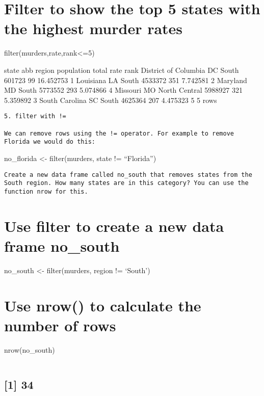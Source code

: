 \documentclass[
]{article}
\begin{document}
\hypertarget{filter-to-show-the-top-5-states-with-the-highest-murder-rates}{%
\section{Filter to show the top 5 states with the highest murder
rates}\label{filter-to-show-the-top-5-states-with-the-highest-murder-rates}}

filter(murders,rate,rank\textless=5)

state abb region population total rate rank District of Columbia DC
South 601723 99 16.452753 1 Louisiana LA South 4533372 351 7.742581 2
Maryland MD South 5773552 293 5.074866 4 Missouri MO North Central
5988927 321 5.359892 3 South Carolina SC South 4625364 207 4.475323 5 5
rows

\begin{verbatim}
5. filter with !=

We can remove rows using the != operator. For example to remove Florida we would do this:
\end{verbatim}

no\_florida \textless- filter(murders, state != ``Florida'')

\begin{verbatim}
Create a new data frame called no_south that removes states from the South region. How many states are in this category? You can use the function nrow for this.
\end{verbatim}

\hypertarget{use-filter-to-create-a-new-data-frame-no_south}{%
\section{Use filter to create a new data frame
no\_south}\label{use-filter-to-create-a-new-data-frame-no_south}}

no\_south \textless- filter(murders, region != `South')

\hypertarget{use-nrow-to-calculate-the-number-of-rows}{%
\section{Use nrow() to calculate the number of
rows}\label{use-nrow-to-calculate-the-number-of-rows}}

nrow(no\_south)

\begin{verbatim}
\end{verbatim}

\hypertarget{section-1}{%
\subsection{{[}1{]} 34}\label{section-1}}
\end{document}
